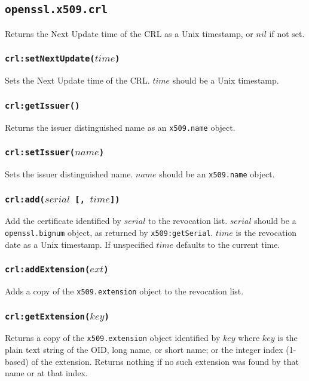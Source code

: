 \documentclass[11pt, oneside]{memoir}
\newcommand*{\fn}[1]{\texttt{#1}\xspace}
\newcommand*{\module}[1]{\texttt{#1}\xspace}
\newcounter{toccols}
\newenvironment{Module}[1]{
	\subsection{\texttt{#1}}
	\addtocontents{toc}{
		\protect\begin{multicols}{\value{toccols}}
	}
}{
	\addtocontents{toc}{\protect\end{multicols}}
}
\begin{document}
\begin{Module}{openssl.x509.crl}
Returns the Next Update time of the CRL as a Unix timestamp, or $nil$ if not set.

\subsubsection[\fn{crl:setNextUpdate}]{\fn{crl:setNextUpdate($time$)}}

Sets the Next Update time of the CRL. $time$ should be a Unix timestamp.

\subsubsection[\fn{crl:getIssuer}]{\fn{crl:getIssuer()}}

Returns the issuer distinguished name as an \module{x509.name} object.

\subsubsection[\fn{crl:setIssuer}]{\fn{crl:setIssuer($name$)}}

Sets the issuer distinguished name. $name$ should be an \module{x509.name} object.

\subsubsection[\fn{crl:add}]{\fn{crl:add($serial$ [, $time$])}}

Add the certificate identified by $serial$ to the revocation list. $serial$ should be a \module{openssl.bignum} object, as returned by \fn{x509:getSerial}. $time$ is the revocation date as a Unix timestamp. If unspecified $time$ defaults to the current time.

\subsubsection[\fn{crl:addExtension}]{\fn{crl:addExtension($ext$)}}

Adds a copy of the \module{x509.extension} object to the revocation list. 

\subsubsection[\fn{crl:getExtension}]{\fn{crl:getExtension($key$)}}

Returns a copy of the \module{x509.extension} object identified by $key$ where $key$ is the plain text string of the OID, long name, or short name; or the integer index (1-based) of the extension. Returns nothing if no such extension was found by that name or at that index.


\end{Module}
\end{document}
